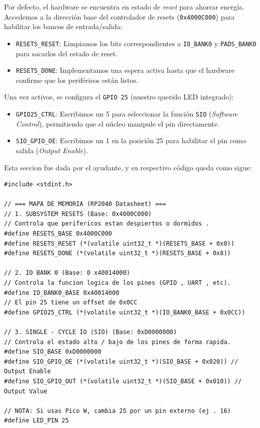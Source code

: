 \documentclass[12pt,letterpaper]{article}
\begin{document}
Por defecto, el hardware se encuentra en estado de \textit{reset} para ahorrar energía. Accedemos a la dirección base del controlador de resets (\texttt{0x4000C000}) para habilitar los bancos de entrada/salida:

\begin{itemize}
\item \texttt{RESETS\_RESET}: Limpiamos los bits correspondientes a \texttt{IO\_BANK0} y \texttt{PADS\_BANK0} para sacarlos del estado de reset.
\item \texttt{RESETS\_DONE}: Implementamos una espera activa hasta que el hardware confirme que los periféricos están listos.
\end{itemize}

Una vez activos, se configura el \texttt{GPIO 25} (nuestro querido LED integrado):
\begin{itemize}
    \item \texttt{GPIO25\_CTRL}: Escribimos un 5 para seleccionar la función \texttt{SIO} (\textit{Software Control}), permitiendo que el núcleo manipule el pin directamente.
    \item \texttt{SIO\_GPIO\_OE}: Escribimos un 1 en la posición 25 para habilitar el pin como salida (\textit{Output Enable}).
\end{itemize}

Esta seccion fue dada por el ayudante, y su respectivo código queda como sigue:

\begin{lstlisting}[style=modernc, caption={Definición de Registros y Mapeo de Memoria, main.c}]
#include <stdint.h>

// === MAPA DE MEMORIA (RP2040 Datasheet) ===
// 1. SUBSYSTEM RESETS (Base: 0x4000C000)
// Controla que perifericos estan despiertos o dormidos .
#define RESETS_BASE 0x4000C000
#define RESETS_RESET (*(volatile uint32_t *)(RESETS_BASE + 0x0))
#define RESETS_DONE (*(volatile uint32_t *)(RESETS_BASE + 0x8))

// 2. IO BANK 0 (Base: 0 x40014000)
// Controla la funcion logica de los pines (GPIO , UART , etc).
#define IO_BANK0_BASE 0x40014000
// El pin 25 tiene un offset de 0x0CC
#define GPIO25_CTRL (*(volatile uint32_t *)(IO_BANK0_BASE + 0x0CC))

// 3. SINGLE - CYCLE IO (SIO) (Base: 0xD0000000)
// Controla el estado alto / bajo de los pines de forma rapida.
#define SIO_BASE 0xD0000000
#define SIO_GPIO_OE (*(volatile uint32_t *)(SIO_BASE + 0x020)) // Output Enable
#define SIO_GPIO_OUT (*(volatile uint32_t *)(SIO_BASE + 0x010)) // Output Value

// NOTA: Si usas Pico W, cambia 25 por un pin externo (ej . 16)
#define LED_PIN 25
\end{lstlisting}
\end{document}
